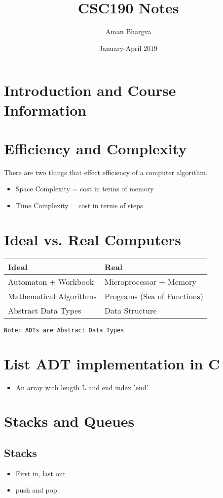 \documentclass[a4paper,12pt]{article}
\begin{document}
\title{CSC190 Notes}
\author{Aman Bhargva}
\date{January-April 2019}
\maketitle

\tableofcontents

\section{Introduction and Course Information}

\section{Efficiency and Complexity}
There are two things that effect efficiency of a computer algorithm.
\begin{itemize}
\item Space Complexity = cost in terms of memory
\item Time Complexity = cost in terms of steps
\end{itemize}

\section{Ideal vs. Real Computers}
\begin{tabular}{l|l}
Ideal & Real \\
\hline
Automaton + Workbook & Microprocessor + Memory \\
Mathematical Algorithms & Programs (Sea of Functions) \\
Abstract Data Types & Data Structure 
\end{tabular}

\texttt{Note: ADTs are Abstract Data Types}

\section{List ADT implementation in C}
\begin{itemize}
\item An array with length L and end index 'end'
\end{itemize}

\section{Stacks and Queues}
\subsection{Stacks}
\begin{itemize}
\item First in, last out
\item push and pop
\end{itemize}
\end{document}
